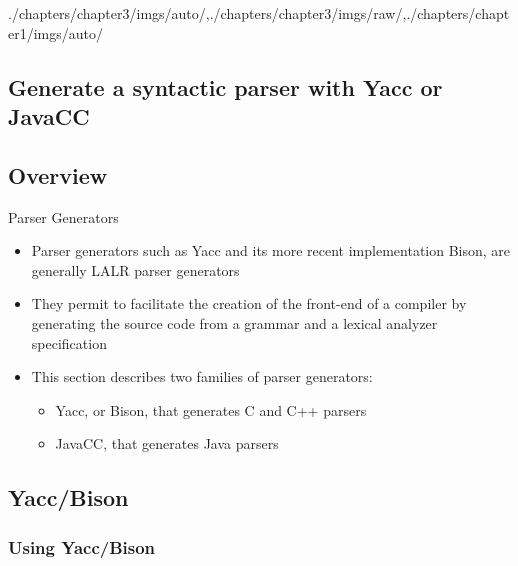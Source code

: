 \begin{graphicspathcontext}{{./chapters/chapter3/imgs/auto/},{./chapters/chapter3/imgs/raw/},{./chapters/chapter1/imgs/auto/}}
\begin{bibunit}[apalike]
\section[Parser Generators]{Generate a syntactic parser with Yacc or JavaCC}
\sectiontableofcontentslide

\subsection{Overview}

\begin{frame}{Parser Generators}
	\begin{itemize}
	\item Parser generators such as Yacc and its more recent implementation Bison, are generally LALR parser generators
	\item They permit to facilitate the creation of the front-end of a compiler by generating the source code from a grammar and a lexical analyzer specification
	\vfill
	\item This section describes two families of parser generators:
		\begin{itemize}
		\item Yacc, or Bison, that generates C and C++ parsers
		\item JavaCC, that generates Java parsers
		\end{itemize}
	\end{itemize}
	\begin{center}
	\end{center}
\end{frame}

\subsection{Yacc/Bison}
\subsectiontableofcontentslide*

\subsubsection{Using Yacc/Bison}



\end{bibunit}
\end{graphicspathcontext}
